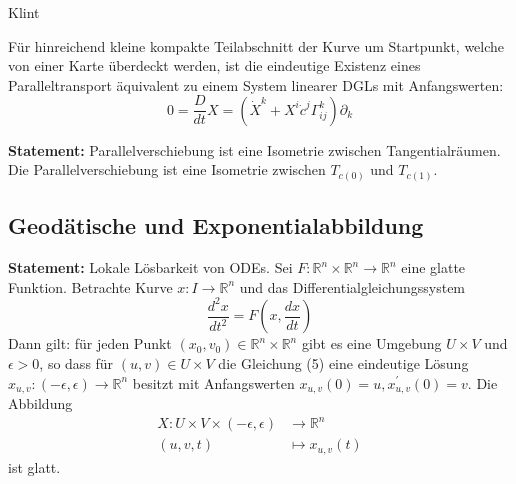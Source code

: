 \documentclass[10pt, letterpaper]{article}
\begin{document}
{Klint}
{%
\begin{outline}
  Für hinreichend kleine kompakte Teilabschnitt der Kurve um Startpunkt, welche von einer Karte überdeckt werden, ist die eindeutige Existenz eines Paralleltransport äquivalent zu einem System linearer DGLs mit Anfangswerten:
  $$0=\frac{D}{dt}X=(\dot{X}^k+X^i\dot{c}^j\Gamma_{ij}^k)\partial_k$$
\end{outline}
}


\vspace{0.7cm}

\textbf{Statement: }{Parallelverschiebung ist eine Isometrie zwischen Tangentialräumen}.
Die Parallelverschiebung ist eine Isometrie zwischen $T_{c(0)}$ und $T_{c(1)}$.


\vspace{0.8cm}



\pagebreak

\subsection{Geodätische und Exponentialabbildung}


\textbf{Statement: }{Lokale Lösbarkeit von ODEs}.
Sei $F: \mathbb{R}^{n} \times \mathbb{R}^{n} \rightarrow \mathbb{R}^{n}$ eine glatte Funktion. Betrachte Kurve $x: I \rightarrow \mathbb{R}^{n}$ und das Differentialgleichungssystem
\begin{equation*}
\frac{d^{2} x}{d t^{2}}=F\left(x, \frac{d x}{d t}\right) \tag{5}
\end{equation*}
Dann gilt: für jeden Punkt $\left(x_{0}, v_{0}\right) \in \mathbb{R}^{n} \times \mathbb{R}^{n}$ gibt es eine Umgebung $U \times V$ und $\epsilon>0$, so dass für $(u, v) \in U \times V$ die Gleichung (5) eine eindeutige Lösung $x_{u, v}:(-\epsilon, \epsilon) \rightarrow \mathbb{R}^{n}$ besitzt mit Anfangswerten $x_{u, v}(0)=u, x_{u, v}^{\prime}(0)=v$. Die Abbildung
$$
\begin{aligned}
X: U \times V \times(-\epsilon, \epsilon) & \rightarrow \mathbb{R}^{n} \\
(u, v, t) & \mapsto x_{u, v}(t)
\end{aligned}
$$
ist glatt.

\StructurePic{}{}{%
  \begin{outline}
 
  \end{outline}
}
\end{document}
